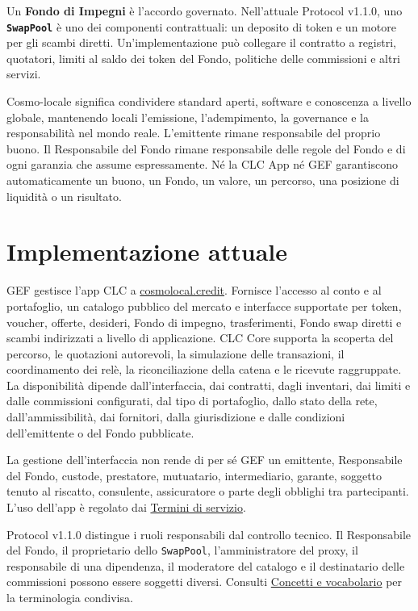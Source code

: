 \documentclass[11pt]{article}
\begin{document}
Un \textbf{Fondo di Impegni} è l'accordo governato. Nell'attuale Protocol v1.1.0, uno \textbf{\texttt{SwapPool}} è uno dei componenti contrattuali: un deposito di token e un motore per gli scambi diretti. Un'implementazione può collegare il contratto a registri, quotatori, limiti al saldo dei token del Fondo, politiche delle commissioni e altri servizi.

Cosmo-locale significa condividere standard aperti, software e conoscenza a livello globale, mantenendo locali l'emissione, l'adempimento, la governance e la responsabilità nel mondo reale. L'emittente rimane responsabile del proprio buono. Il Responsabile del Fondo rimane responsabile delle regole del Fondo e di ogni garanzia che assume espressamente. Né la CLC App né GEF garantiscono automaticamente un buono, un Fondo, un valore, un percorso, una posizione di liquidità o un risultato.

\section*{Implementazione attuale}

GEF gestisce l'app CLC a \href{https://cosmolocal.credit}{cosmolocal.credit}. Fornisce l'accesso al conto e al portafoglio, un catalogo pubblico del mercato e interfacce supportate per token, voucher, offerte, desideri, Fondo di impegno, trasferimenti, Fondo swap diretti e scambi indirizzati a livello di applicazione. CLC Core supporta la scoperta del percorso, le quotazioni autorevoli, la simulazione delle transazioni, il coordinamento dei relè, la riconciliazione della catena e le ricevute raggruppate. La disponibilità dipende dall'interfaccia, dai contratti, dagli inventari, dai limiti e dalle commissioni configurati, dal tipo di portafoglio, dallo stato della rete, dall'ammissibilità, dai fornitori, dalla giurisdizione e dalle condizioni dell'emittente o del Fondo pubblicate.

La gestione dell'interfaccia non rende di per sé GEF un emittente, Responsabile del Fondo, custode, prestatore, mutuatario, intermediario, garante, soggetto tenuto al riscatto, consulente, assicuratore o parte degli obblighi tra partecipanti. L'uso dell'app è regolato dai \href{https://docs.cosmolocal.credit/it/governance/terms}{Termini di servizio}.

Protocol v1.1.0 distingue i ruoli responsabili dal controllo tecnico. Il Responsabile del Fondo, il proprietario dello \texttt{SwapPool}, l'amministratore del proxy, il responsabile di una dipendenza, il moderatore del catalogo e il destinatario delle commissioni possono essere soggetti diversi. Consulti \href{https://docs.cosmolocal.credit/it/introduction/concepts}{Concetti e vocabolario} per la terminologia condivisa.
\end{document}

